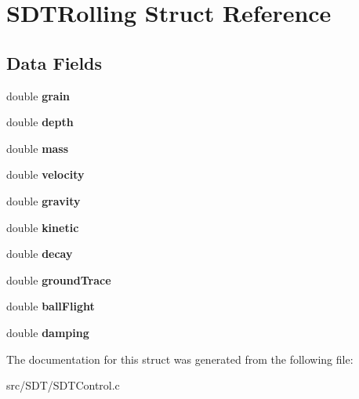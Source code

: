\hypertarget{struct_s_d_t_rolling}{}\section{S\+D\+T\+Rolling Struct Reference}
\label{struct_s_d_t_rolling}
\subsection*{Data Fields}
\begin{DoxyCompactItemize}
\item 
\hypertarget{struct_s_d_t_rolling_a70338fcaf3537644825b356846dc7de8}{}double {\bfseries grain}\label{struct_s_d_t_rolling_a70338fcaf3537644825b356846dc7de8}

\item 
\hypertarget{struct_s_d_t_rolling_a6153a438c3d8d1be934e19e97e58c60c}{}double {\bfseries depth}\label{struct_s_d_t_rolling_a6153a438c3d8d1be934e19e97e58c60c}

\item 
\hypertarget{struct_s_d_t_rolling_a244bf42c46054cf1113be44d55f2156d}{}double {\bfseries mass}\label{struct_s_d_t_rolling_a244bf42c46054cf1113be44d55f2156d}

\item 
\hypertarget{struct_s_d_t_rolling_accacf4e9263030d70ed79f8516c0eac5}{}double {\bfseries velocity}\label{struct_s_d_t_rolling_accacf4e9263030d70ed79f8516c0eac5}

\item 
\hypertarget{struct_s_d_t_rolling_a922f2c43a75edbe2ee21ea7ba7b5cb2c}{}double {\bfseries gravity}\label{struct_s_d_t_rolling_a922f2c43a75edbe2ee21ea7ba7b5cb2c}

\item 
\hypertarget{struct_s_d_t_rolling_ad7155ecd3187d7ad8adbcba51557b85a}{}double {\bfseries kinetic}\label{struct_s_d_t_rolling_ad7155ecd3187d7ad8adbcba51557b85a}

\item 
\hypertarget{struct_s_d_t_rolling_ab01a33c3f845cc963c97a17973b4e871}{}double {\bfseries decay}\label{struct_s_d_t_rolling_ab01a33c3f845cc963c97a17973b4e871}

\item 
\hypertarget{struct_s_d_t_rolling_aa403a364bd1d278300db9c2c176e8498}{}double {\bfseries ground\+Trace}\label{struct_s_d_t_rolling_aa403a364bd1d278300db9c2c176e8498}

\item 
\hypertarget{struct_s_d_t_rolling_a849cc79b1903e786d64a17476f5ab6e1}{}double {\bfseries ball\+Flight}\label{struct_s_d_t_rolling_a849cc79b1903e786d64a17476f5ab6e1}

\item 
\hypertarget{struct_s_d_t_rolling_ab1313a45052f337646283d9e9b05cc7b}{}double {\bfseries damping}\label{struct_s_d_t_rolling_ab1313a45052f337646283d9e9b05cc7b}

\end{DoxyCompactItemize}


The documentation for this struct was generated from the following file\+:\begin{DoxyCompactItemize}
\item 
src/\+S\+D\+T/S\+D\+T\+Control.\+c\end{DoxyCompactItemize}
